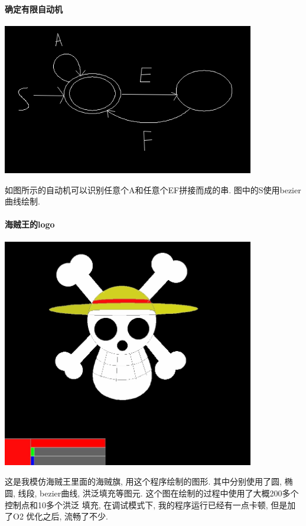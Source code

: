 \documentclass{article}
\begin{document}
		\paragraph{确定有限自动机}
			\begin{center}
				\includegraphics[width = 11cm]{auto.jpeg} \\
			\end{center}
			如图所示的自动机可以识别任意个A和任意个EF拼接而成的串.
			图中的S使用bezier曲线绘制.
		\paragraph{海贼王的logo}
			\begin{center}
				\includegraphics[width = 11cm]{op.jpeg} \\
			\end{center}
			这是我模仿海贼王里面的海贼旗, 用这个程序绘制的图形.
			其中分别使用了圆, 椭圆, 线段, bezier曲线, 洪泛填充等图元.
			这个图在绘制的过程中使用了大概200多个控制点和10多个洪泛
			填充, 在调试模式下, 我的程序运行已经有一点卡顿, 但是加了O2
			优化之后, 流畅了不少.
\end{document}
